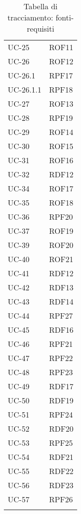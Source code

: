 \begin{longtable}{| p{5cm} | p{5cm} |}
		UC-25 & ROF11 \\
		\rowcolor{LightGray}
		UC-26 & ROF12 \\
		UC-26.1 & RPF17 \\
		\rowcolor{LightGray}
		UC-26.1.1 & RPF18\\
		UC-27 & ROF13 \\
		\rowcolor{LightGray}
		UC-28 & RPF19 \\
		UC-29 & ROF14 \\
		\rowcolor{LightGray}
		UC-30 & ROF15 \\
		UC-31 & ROF16 \\
		\rowcolor{LightGray}
		UC-32 & RDF12\\
		UC-34 & ROF17\\
		\rowcolor{LightGray}
		UC-35 & ROF18\\
		UC-36 & RPF20\\
		\rowcolor{LightGray}
		UC-37 & ROF19\\
		UC-39 & ROF20\\
		\rowcolor{LightGray}
		UC-40 & ROF21\\
		UC-41 & RDF12\\
		\rowcolor{LightGray}
		UC-42 & RDF13\\
		UC-43 & RDF14\\
		\rowcolor{LightGray}
		UC-44 & RPF27\\
		UC-45 & RDF16\\
		\rowcolor{LightGray}
		UC-46 & RPF21\\
		UC-47 & RPF22\\
		\rowcolor{LightGray}
		UC-48 & RPF23\\
		UC-49 & RDF17 \\
		\rowcolor{LightGray}
		UC-50 & RDF19 \\
		UC-51 & RPF24 \\
		\rowcolor{LightGray}
		UC-52 & RDF20 \\
		UC-53 & RPF25 \\
		\rowcolor{LightGray}
		UC-54 & RDF21 \\
		UC-55 & RDF22 \\
		\rowcolor{LightGray}
		UC-56 & RDF23 \\
		UC-57 & RPF26 \\
		\rowcolor{LightGray}
		\hline
		\caption{Tabella di tracciamento: fonti-requisiti}
\end{longtable}
\newpage
